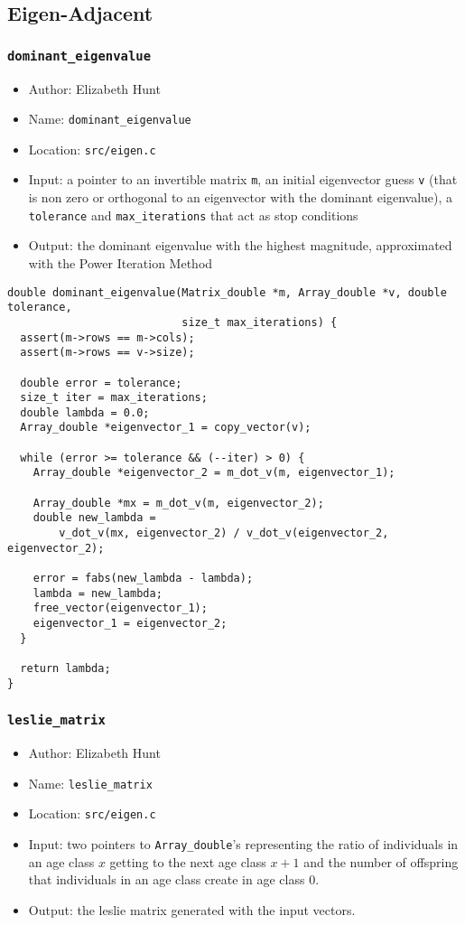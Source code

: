 \documentclass[11pt]{article}
\begin{document}
\subsection{Eigen-Adjacent}
\label{sec:org6bea1aa}
\subsubsection{\texttt{dominant\_eigenvalue}}
\label{sec:org0e70920}
\begin{itemize}
\item Author: Elizabeth Hunt
\item Name: \texttt{dominant\_eigenvalue}
\item Location: \texttt{src/eigen.c}
\item Input: a pointer to an invertible matrix \texttt{m}, an initial eigenvector guess \texttt{v} (that is non
zero or orthogonal to an eigenvector with the dominant eigenvalue), a \texttt{tolerance} and
\texttt{max\_iterations} that act as stop conditions
\item Output: the dominant eigenvalue with the highest magnitude, approximated with the Power
Iteration Method
\end{itemize}

\begin{verbatim}
double dominant_eigenvalue(Matrix_double *m, Array_double *v, double tolerance,
                           size_t max_iterations) {
  assert(m->rows == m->cols);
  assert(m->rows == v->size);

  double error = tolerance;
  size_t iter = max_iterations;
  double lambda = 0.0;
  Array_double *eigenvector_1 = copy_vector(v);

  while (error >= tolerance && (--iter) > 0) {
    Array_double *eigenvector_2 = m_dot_v(m, eigenvector_1);

    Array_double *mx = m_dot_v(m, eigenvector_2);
    double new_lambda =
        v_dot_v(mx, eigenvector_2) / v_dot_v(eigenvector_2, eigenvector_2);

    error = fabs(new_lambda - lambda);
    lambda = new_lambda;
    free_vector(eigenvector_1);
    eigenvector_1 = eigenvector_2;
  }

  return lambda;
}
\end{verbatim}
\subsubsection{\texttt{leslie\_matrix}}
\label{sec:org88d4547}
\begin{itemize}
\item Author: Elizabeth Hunt
\item Name: \texttt{leslie\_matrix}
\item Location: \texttt{src/eigen.c}
\item Input: two pointers to \texttt{Array\_double}'s representing the ratio of individuals in an age class
\(x\) getting to the next age class \(x+1\) and the number of offspring that individuals in an age
class create in age class 0.
\item Output: the leslie matrix generated with the input vectors.
\end{itemize}
\end{document}
